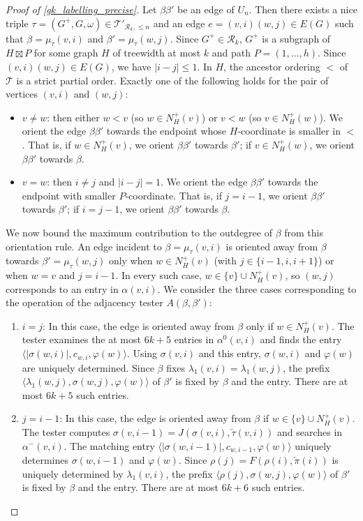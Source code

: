 \documentclass{patmorin}
\renewcommand{\le}{\leqslant}
\newcommand{\calR}{\mathcal{R}}
\newcommand{\calT}{\mathcal{T}}
\begin{document}
\begin{proof}[Proof of \cref{gk_labelling_precise}]
  Let $\beta\beta'$ be an edge of $U_n$. Then there exists a nice triple $\tau=(G^+,G,\omega)\in\calT'_{\calR_k,\le n}$ and an edge $e=(v,i)(w,j)\in E(G)$ such that $\beta=\mu_\tau(v,i)$ and $\beta'=\mu_\tau(w,j)$. Since $G^+\in\calR_k$, $G^+$ is a subgraph of $H\boxtimes P$ for some graph $H$ of treewidth at most $k$ and path $P=(1,\ldots,h)$. Since $(v,i)(w,j)\in E(G)$, we have $|i-j|\le 1$. In $H$, the ancestor ordering $<$ of $\calT$ is a strict partial order. Exactly one of the following holds for the pair of vertices $(v,i)$ and $(w,j)$:
  \begin{itemize}[nosep,nolistsep]
    \item $v\neq w$: then either $w < v$ (so $w\in N^+_H(v)$) or $v < w$ (so $v\in N^+_H(w)$). We orient the edge $\beta\beta'$ towards the endpoint whose $H$-coordinate is smaller in $<$. That is, if $w\in N^+_H(v)$, we orient $\beta\beta'$ towards $\beta'$; if $v\in N^+_H(w)$, we orient $\beta\beta'$ towards $\beta$.
    \item $v = w$: then $i\neq j$ and $|i-j|=1$. We orient the edge $\beta\beta'$ towards the endpoint with smaller $P$-coordinate. That is, if $j=i-1$, we orient $\beta\beta'$ towards $\beta'$; if $i=j-1$, we orient $\beta\beta'$ towards $\beta$.
  \end{itemize}

  We now bound the maximum contribution to the outdegree of $\beta$ from this orientation rule. An edge incident to $\beta=\mu_\tau(v,i)$ is oriented away from $\beta$ towards $\beta'=\mu_\tau(w,j)$ only when $w\in N^+_H(v)$ (with $j\in\{i-1,i,i+1\}$) or when $w=v$ and $j=i-1$. In every such case, $w\in \{v\}\cup N^+_H(v)$, so $(w,j)$ corresponds to an entry in $\alpha(v,i)$. We consider the three cases corresponding to the operation of the adjacency tester $A(\beta,\beta')$:
  \begin{enumerate}
    \item $i=j$: In this case, the edge is oriented away from $\beta$ only if $w\in N^+_H(v)$. The tester examines the at most $6k+5$ entries in $\alpha^0(v,i)$ and finds the entry $\langle |\sigma(w,i)|, c_{w,i}, \varphi(w)\rangle$. Using $\sigma(v,i)$ and this entry, $\sigma(w,i)$ and $\varphi(w)$ are uniquely determined. Since $\beta$ fixes $\lambda_1(v,i)=\lambda_1(w,j)$, the prefix $\langle \lambda_1(w,j), \sigma(w,j), \varphi(w)\rangle$ of $\beta'$ is fixed by $\beta$ and the entry. There are at most $6k+5$ such entries.
    
    \item $j=i-1$: In this case, the edge is oriented away from $\beta$ if $w\in \{v\}\cup N^+_H(v)$. The tester computes $\sigma(v,i-1)=J(\sigma(v,i),\overleftarrow{\tau}(v,i))$ and searches in $\alpha^-(v,i)$. The matching entry $\langle |\sigma(w,i-1)|, c_{w,i-1}, \varphi(w)\rangle$ uniquely determines $\sigma(w,i-1)$ and $\varphi(w)$. Since $\rho(j)=F(\rho(i),\overleftarrow{\pi}(i))$ is uniquely determined by $\lambda_1(v,i)$, the prefix $\langle \rho(j), \sigma(w,j), \varphi(w)\rangle$ of $\beta'$ is fixed by $\beta$ and the entry. There are at most $6k+6$ such entries.


\end{enumerate}
\end{proof}
\end{document}
